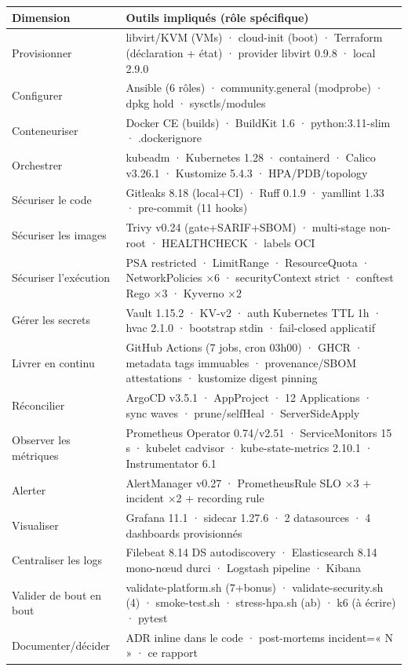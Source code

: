 \documentclass[12pt,a4paper,twoside,openright]{report}
\begin{document}
\begin{center}\label{tab:an-matrice-outils-dimensions-devops}\end{center}
\begin{longtable}{@{}p{3.4cm}p{11.0cm}@{}}
\toprule
\textbf{Dimension} & \textbf{Outils impliqués (rôle spécifique)} \\
\midrule
\endhead
Provisionner & libvirt/KVM (VMs) · cloud-init (boot) · Terraform (déclaration + état) · provider libvirt 0.9.8 · local 2.9.0 \\
Configurer & Ansible (6 rôles) · community.general (modprobe) · dpkg hold · sysctls/modules \\
Conteneuriser & Docker CE (builds) · BuildKit 1.6 · python:3.11-slim · .dockerignore \\
Orchestrer & kubeadm · Kubernetes 1.28 · containerd · Calico v3.26.1 · Kustomize 5.4.3 · HPA/PDB/topology \\
Sécuriser le code & Gitleaks 8.18 (local+CI) · Ruff 0.1.9 · yamllint 1.33 · pre-commit (11 hooks) \\
Sécuriser les images & Trivy v0.24 (gate+SARIF+SBOM) · multi-stage non-root · HEALTHCHECK · labels OCI \\
Sécuriser l'exécution & PSA restricted · LimitRange · ResourceQuota · NetworkPolicies ×6 · securityContext strict · conftest Rego ×3 · Kyverno ×2 \\
Gérer les secrets & Vault 1.15.2 · KV-v2 · auth Kubernetes TTL 1h · hvac 2.1.0 · bootstrap stdin · fail-closed applicatif \\
Livrer en continu & GitHub Actions (7 jobs, cron 03h00) · GHCR · metadata tags immuables · provenance/SBOM attestations · kustomize digest pinning \\
Réconcilier & ArgoCD v3.5.1 · AppProject · 12 Applications · sync waves · prune/selfHeal · ServerSideApply \\
Observer les métriques & Prometheus Operator 0.74/v2.51 · ServiceMonitors 15 s · kubelet cadvisor · kube-state-metrics 2.10.1 · Instrumentator 6.1 \\
Alerter & AlertManager v0.27 · PrometheusRule SLO ×3 + incident ×2 + recording rule \\
Visualiser & Grafana 11.1 · sidecar 1.27.6 · 2 datasources · 4 dashboards provisionnés \\
Centraliser les logs & Filebeat 8.14 DS autodiscovery · Elasticsearch 8.14 mono-nœud durci · Logstash pipeline · Kibana \\
Valider de bout en bout & validate-platform.sh (7+bonus) · validate-security.sh (4) · smoke-test.sh · stress-hpa.sh (ab) · k6 (à écrire) · pytest \\
Documenter/décider & ADR inline dans le code · post-mortems incident=« N » · ce rapport \\
\bottomrule
\end{longtable}
\end{document}
